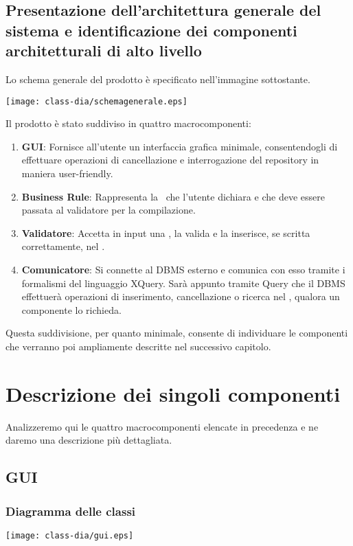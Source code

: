 \section{Presentazione dell'architettura generale del sistema e identificazione dei componenti architetturali di alto livello}
Lo schema generale del prodotto \`e specificato nell'immagine sottostante.
\begin{center}
\texttt{[image: class-dia/schemagenerale.eps]}
\end{center}
Il prodotto \`e stato suddiviso in quattro macrocomponenti:
\begin{enumerate}
 \item \textbf{GUI}: Fornisce all'utente un interfaccia grafica minimale, consentendogli di effettuare operazioni di cancellazione e interrogazione del repository in maniera user-friendly.
\item \textbf{Business Rule}: Rappresenta la \br\ che l'utente dichiara e che deve essere passata al validatore per la compilazione.
\item \textbf{Validatore}: Accetta in input una \br, la valida e la inserisce, se scritta correttamente, nel \rp.
\item \textbf{Comunicatore}: Si connette al DBMS esterno e comunica con esso tramite i formalismi del linguaggio XQuery.
Sar\`a appunto tramite Query che il DBMS effettuer\`a operazioni di inserimento, cancellazione o ricerca nel \rp, qualora un componente lo richieda.
\end{enumerate}
Questa suddivisione, per quanto minimale, consente di individuare le componenti che verranno poi ampliamente descritte nel successivo capitolo.

\chapter{Descrizione dei singoli componenti}
Analizzeremo qui le quattro macrocomponenti elencate in precedenza e ne daremo una descrizione pi\`u dettagliata.

\section{GUI}
\subsection{Diagramma delle classi}
\begin{center}
\texttt{[image: class-dia/gui.eps]}
\end{center}

